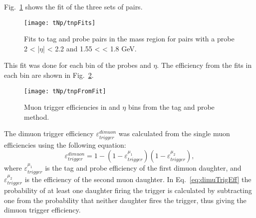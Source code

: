       Fig.~\ref{fig:tnpFitPlot} shows the fit of the three sets of pairs. 
      \begin{figure}[!Hh]
        \centering
        \texttt{[image: tNp/tnpFits]}
        \caption{Fits to tag and probe pairs in the \JPsi{} mass region for
        pairs with a probe 2 < |$\eta$| < 2.2 and 1.55 < \pt{} < 1.8 GeV.}
        \label{fig:tnpFitPlot}
      \end{figure}
      This fit was done for each bin of the probes \pt{} and $\eta$.
      The efficiency from the fits in each bin are shown in Fig.~\ref{fig:tnpTrigMap}.
      \begin{figure}[!Hhbt]
        \centering
        \texttt{[image: tNp/tnpFromFit]}
        \caption{Muon trigger efficiencies in \pt{} and $\eta$ bins from 
          the tag and probe method.}
        \label{fig:tnpTrigMap}
      \end{figure}

      The dimuon trigger efficiency $\varepsilon^{dimuon}_{trigger}$ was 
        calculated from the single muon efficiencies using the following
        equation:
      \begin{equation}
        \label{eq:dimuTrigEff}
        \varepsilon^{dimuon}_{trigger}=1-(1-\varepsilon_{trigger}^{\mu_{1}})(1-\varepsilon_{trigger}^{\mu_{2}}),
      \end{equation}
      where $\varepsilon_{trigger}^{\mu_{1}}$ is the tag and probe efficiency
        of the first dimuon daughter, and $\varepsilon_{trigger}^{\mu_{2}}$ is
        the efficiency of the second muon daughter. 
      In Eq.~\ref{eq:dimuTrigEff} the probability of at least one daughter
        firing the trigger is calculated by subtracting one from the
        probability that neither daughter fires the trigger,
        thus giving the dimuon trigger efficiency. 

